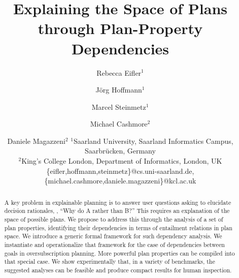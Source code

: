 \documentclass{article}
\begin{document}
\title{Explaining the Space of Plans through Plan-Property Dependencies}

\author{
Rebecca Eifler$^1$\and
J\"org Hoffmann$^1$\and
Marcel Steinmetz$^1$\and
Michael Cashmore$^2$\and
Daniele Magazzeni$^2$
\affiliations
$^1$Saarland University, Saarland Informatics Campus, Saarbr\"ucken, Germany\\
$^2$King's College London, Department of Informatics, London, UK\\
\emails
\{eifler,hoffmann,steinmetz\}@cs.uni-saarland.de,
\{michael.cashmore,daniele.magazzeni\}@kcl.ac.uk 
}
%

\maketitle

\begin{abstract}
A key problem in explainable planning is to answer user questions
asking to elucidate decision rationales, \eg, ``Why do A rather than
B?'' This requires an explanation of the space of possible plans. We
propose to address this through the analysis of a set of plan
properties, identifying their dependencies in terms of entailment
relations in plan space. We introduce a generic formal framework for
such dependency analysis. We instantiate and operationalize that
framework for the case of dependencies between goals in
oversubscription planning.
%
%
%
More powerful plan properties can be compiled into that special case.
%
We show experimentally that, in a variety of benchmarks, the suggested
analyses can be feasible and produce compact results for human
inspection.
\end{abstract}
\end{document}
